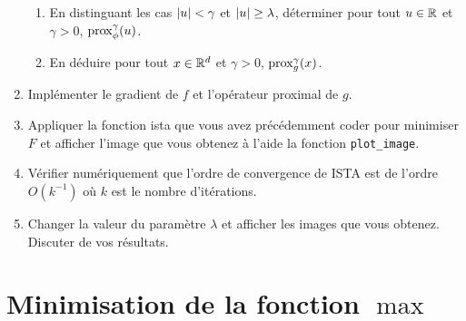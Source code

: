 \documentclass[a4paper,french,12pt]{article}
\begin{document}
\begin{enumerate}
\begin{enumerate}
  \item En distinguant les cas $\left\vert u \right\vert < \gamma$ et $\left\vert u \right\vert \geq \lambda$, déterminer pour tout $u \in \mathbb{R}$ et $\gamma >0$, $\operatorname{prox}_{\phi}^{\gamma}(u)$.
    
  \item En déduire pour tout $x \in \mathbb{R}^d$ et $\gamma >0$, $\operatorname{prox}_{g}^{\gamma}(x)$. 
  \end{enumerate}
  
\item Implémenter le gradient de $f$ et l'opérateur proximal de $g$.
  
\item Appliquer la fonction ista que vous avez précédemment coder pour minimiser $F$ et afficher l'image que vous obtenez à l'aide la fonction \lstinline+plot_image+.
  
\item Vérifier numériquement que l'ordre de convergence de ISTA est de l'ordre $O(k^{-1})$ où $k$ est le nombre d'itérations.
  
\item Changer la valeur du paramètre $\lambda$ et afficher les images que vous obtenez. Discuter de vos résultats. 
\end{enumerate}

\section{Minimisation de la fonction $\max$}
\label{sec:minimisation-de-la}
\end{document}
